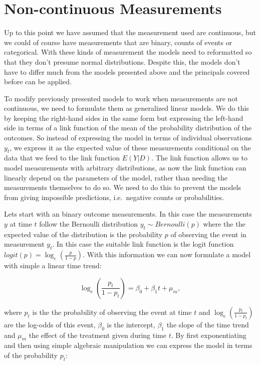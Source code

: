 \documentclass[12pt,a4paper,leqno]{report}
\theoremstyle{plain}
\theoremstyle{definition}
\theoremstyle{remark}
\begin{document}
\section{Non-continuous Measurements}\label{noncontinuous}

Up to this point we have assumed that the measurement used are continuous, but
we could of course have measurements that are binary, counts of events or
categorical. With these kinds of measurement the models need to reformatted so that
they don't presume normal distributions. Despite this, the models don't
have to differ much from the models presented above and the principals covered
before can be applied.

To modify previously presented models to work when measurements are not
continuous, we need to formulate them as generalized linear models. We do
this by keeping the right-hand sides in the same form but expressing the
left-hand side in terms of a link function of the mean of the probability
distribution of the outcomes. So instead of expressing the model in terms of
individual observations \(y_t\), we express it as the expected value of these
measurements conditional on the data that we feed to the link
function \(E(Y|D)\). The link function allows us to model measurements with arbitrary
distributions, as now the link function can linearly depend on the parameters of
the model, rather than needing the measurements themselves to do so. We need to
do this to prevent the models from giving impossible predictions, i.e.\ negative
counts or probabilities.

Lets start with an binary outcome measurements. In this case the
measurements \(y\) at time \(t\) follow the Bernoulli distribution \(y_t \sim
Bernoulli(p)\) where the the expected value of the distribution is the
probability \(p\) of observing the event in measurement \(y_t\). In this case
the suitable link function is the logit function
\(logit(p)=\log_e(\frac{p}{1-p})\). With this information we can now formulate a
model with simple a linear time trend:

\begin{def}\label{}
    \begin{equation}
        \log_e(\frac{p_t}{1-p_t})=\beta_0 + \beta_1 t + \mu_m,
    \end{equation}
\end{def}where \(p_t\) is the the probability of observing the event at time
\(t\) and \(\log_e(\frac{p_t}{1-p_t})\) are the log-odds of this event,
\(\beta_0\) is the intercept, \(\beta_1\) the slope of the time trend and
\(\mu_m\) the effect of the treatment given during time \(t\). By first
exponentiating and then using simple algebraic manipulation we can
express the model in terms of the probability \(p_t\):
\end{document}
